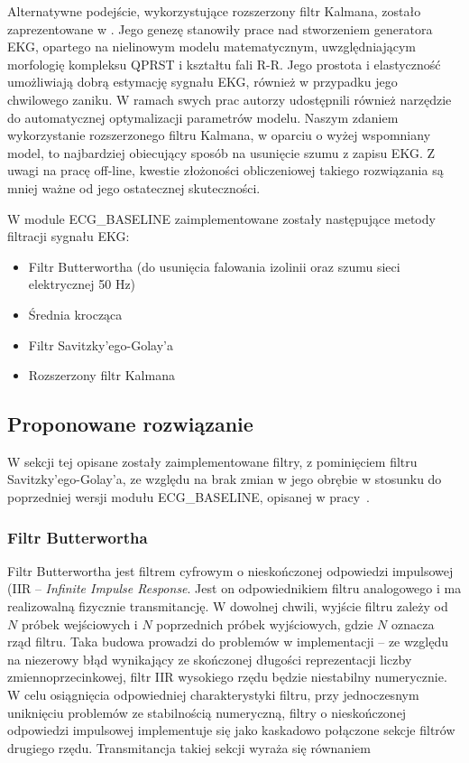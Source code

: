 Alternatywne podejście, wykorzystujące rozszerzony filtr Kalmana, zostało zaprezentowane w \cite{Sameni2005-1, Sameni2005-2}. Jego genezę stanowiły prace nad stworzeniem generatora EKG, opartego na nielinowym modelu matematycznym, uwzględniającym morfologię kompleksu QPRST i kształtu fali R-R. Jego prostota i elastyczność umożliwiają dobrą estymację sygnału EKG, również w przypadku jego chwilowego zaniku. W ramach swych prac autorzy udostępnili również narzędzie do automatycznej optymalizacji parametrów modelu. Naszym zdaniem wykorzystanie rozszerzonego filtru Kalmana, w oparciu o wyżej wspomniany model, to najbardziej obiecujący sposób na usunięcie szumu z zapisu EKG. Z uwagi na pracę off-line, kwestie złożoności obliczeniowej takiego rozwiązania są mniej ważne od jego ostatecznej skuteczności. 

W module ECG\_BASELINE zaimplementowane zostały następujące metody filtracji sygnału EKG: 
\begin{itemize}
\item Filtr Butterwortha (do usunięcia falowania izolinii oraz szumu sieci elektrycznej 50 Hz)
\item Średnia krocząca
\item Filtr Savitzky'ego-Golay'a
\item Rozszerzony filtr Kalmana
\end{itemize}

\subsection{Proponowane rozwiązanie}

W sekcji tej opisane zostały zaimplementowane filtry, z pominięciem filtru Savitzky'ego-Golay'a, ze względu na brak zmian w jego obrębie w stosunku do poprzedniej wersji modułu ECG\_BASELINE, opisanej w pracy~\cite{Baseline2013}.

\subsubsection{Filtr Butterwortha}

Filtr Butterwortha jest filtrem cyfrowym o nieskończonej odpowiedzi impulsowej (IIR -- \emph{Infinite Impulse Response}. Jest on odpowiednikiem filtru analogowego i ma realizowalną fizycznie transmitancję. W dowolnej chwili, wyjście filtru zależy od $N$ próbek wejściowych i $N$ poprzednich próbek wyjściowych, gdzie $N$ oznacza rząd filtru. Taka budowa prowadzi do problemów w implementacji -- ze względu na niezerowy błąd wynikający ze skończonej długości reprezentacji liczby zmiennoprzecinkowej, filtr IIR wysokiego rzędu będzie niestabilny numerycznie. W celu osiągnięcia odpowiedniej charakterystyki filtru, przy jednoczesnym uniknięciu problemów ze stabilnością numeryczną, filtry o nieskończonej odpowiedzi impulsowej implementuje się jako kaskadowo połączone sekcje filtrów drugiego rzędu. Transmitancja takiej sekcji wyraża się równaniem

